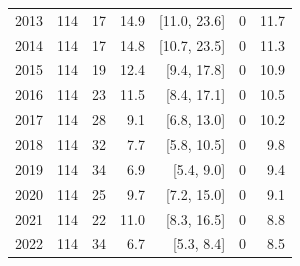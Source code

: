 \begin{longtable}{@{}rrrrrrr@{}}
2013 & 114 & 17 & 14.9 & [11.0, 23.6] & 0 & 11.7 \\
2014 & 114 & 17 & 14.8 & [10.7, 23.5] & 0 & 11.3 \\
2015 & 114 & 19 & 12.4 & [9.4, 17.8] & 0 & 10.9 \\
2016 & 114 & 23 & 11.5 & [8.4, 17.1] & 0 & 10.5 \\
2017 & 114 & 28 & 9.1 & [6.8, 13.0] & 0 & 10.2 \\
2018 & 114 & 32 & 7.7 & [5.8, 10.5] & 0 & 9.8 \\
2019 & 114 & 34 & 6.9 & [5.4, 9.0] & 0 & 9.4 \\
2020 & 114 & 25 & 9.7 & [7.2, 15.0] & 0 & 9.1 \\
2021 & 114 & 22 & 11.0 & [8.3, 16.5] & 0 & 8.8 \\
2022 & 114 & 34 & 6.7 & [5.3, 8.4] & 0 & 8.5 \\
\end{longtable}
\vspace{-6pt}
\endgroup
